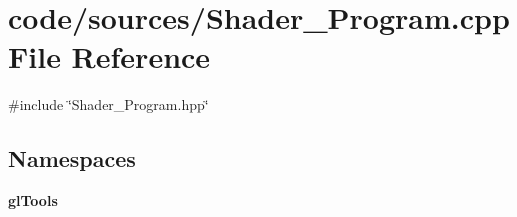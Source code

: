\section{code/sources/\+Shader\+\_\+\+Program.cpp File Reference}
\label{_shader___program_8cpp}
{\ttfamily \#include \char`\"{}Shader\+\_\+\+Program.\+hpp\char`\"{}}\newline
\subsection*{Namespaces}
\begin{DoxyCompactItemize}
\item 
 \textbf{ gl\+Tools}
\end{DoxyCompactItemize}
